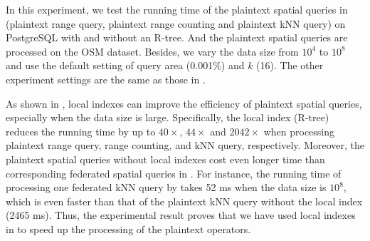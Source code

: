 In this experiment, we test the running time of the plaintext spatial queries in \sysname (\ie plaintext range query, plaintext range counting and plaintext kNN query) on PostgreSQL with and without an R-tree. And the plaintext spatial queries are processed on the OSM dataset. Besides, we vary the data size from $10^4$ to $10^8$ and use the default setting of query area (0.001\%) and $k$ (16). The other experiment settings are the same as those in .

As shown in , local indexes can improve the efficiency of plaintext spatial queries, especially when the data size is large. Specifically, the local index (R-tree) reduces the running time by up to $40\times$, $44\times$ and $2042\times$ when processing plaintext range query, range counting, and kNN query, respectively. Moreover, the plaintext spatial queries without local indexes cost even longer time than corresponding federated spatial queries in \sysname. For instance, the running time of processing one federated kNN query by \sysname takes 52 ms when the data size is $10^8$, which is even faster than that of the plaintext kNN query without the local index (2465 ms). Thus, the experimental result proves that we have used local indexes in \sysname to speed up the processing of the plaintext operators.


